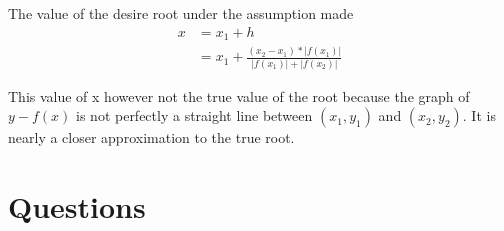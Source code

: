 \documentclass[11pt, a4paper, oneside]{book}
\begin{document}
            The value of the desire root under the assumption made
            \begin{align*}
              x &= x_1+h\\
                &= x_1+\frac{(x_2-x_1)*|f(x_1)|}{|f(x_1)|+|f(x_2)|}
            \end{align*}

            This value of x however not the true value of the root because the graph of $y-f(x)$
            is not perfectly a straight line between $(x_1,y_1)$ and $(x_2,y_2)$. It is nearly a
            closer approximation to the true root.

          \section*{Questions}%

\end{document}
